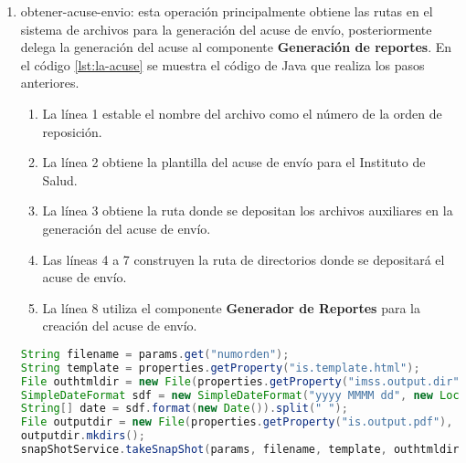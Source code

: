 \begin{enumerate}
\begin{lstlisting}[language=Java, caption={Método para calcular las fechas de fabricación y caducidad.}, label={lst:la-dates}]
	return fechas;
}
	\end{lstlisting}

	\item obtener-acuse-envio: esta operación principalmente obtiene las rutas en el sistema de archivos para la generación del acuse de envío, posteriormente delega la generación del acuse al componente \textbf{Generación de reportes}. En el código \ref{lst:la-acuse} se muestra el código de Java que realiza los pasos anteriores.
	\begin{enumerate}
		\item La línea 1 estable el nombre del archivo como el número de la orden de reposición.
		\item La línea 2 obtiene la plantilla del acuse de envío para el Instituto de Salud.
		\item La línea 3 obtiene la ruta donde se depositan los archivos auxiliares en la generación del acuse de envío.
		\item Las líneas 4 a 7 construyen la ruta de directorios donde se depositará el acuse de envío.
		\item La línea 8 utiliza el componente \textbf{Generador de Reportes} para la creación del acuse de envío.
	\end{enumerate}
	\begin{lstlisting}[language=Java, caption={Generación del acuse de envío.}, label={lst:la-acuse}]
String filename = params.get("numorden");
String template = properties.getProperty("is.template.html");
File outhtmldir = new File(properties.getProperty("imss.output.dir"), filename + ".html");
SimpleDateFormat sdf = new SimpleDateFormat("yyyy MMMM dd", new Locale("es", "MX"));
String[] date = sdf.format(new Date()).split(" ");
File outputdir = new File(properties.getProperty("is.output.pdf"), String.format(REPORT_DIR_TMPL, date[0], date[1], date[2]));
outputdir.mkdirs();
snapShotService.takeSnapShot(params, filename, template, outhtmldir, outputdir);
	\end{lstlisting}

\end{enumerate}
